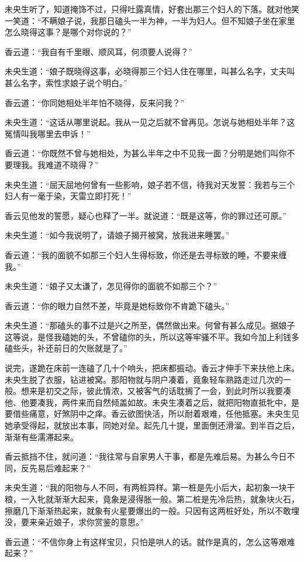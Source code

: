 \documentclass[a4paper,12pt,UTF8,twoside]{ctexbook}
\begin{document}
未央生听了，知道掩饰不过，只得吐露真情，好套出那三个妇人的下落。就对他笑一笑道：“不瞒娘子说，我那日磕头一半为神，一半为妇人。但不知娘子坐在家里怎么晓得这事？是哪个对你说的？”

香云道：“我自有千里眼、顺风耳，何须要人说得？”

未央生道：“娘子既晓得这事，必晓得那三个妇人住在哪里，叫甚么名字，丈夫叫甚么名字，索性求娘子说个明白。”

香云道：“你同她相处半年怕不晓得，反来问我？”

未央生道：“这话从哪里说起。我从一见之后就不曾再见。怎说与她相处半年？这冤情叫我哪里去申诉！”

香云道：“你既然不曾与她相处，为甚么半年之中不见我一面？分明是她们叫你不要理我。我难道不晓得？”

未央生道：“屈天屈地何曾有一些影响，娘子若不信，待我对天发誓：我若与三个妇人有一毫于染，天雷立即打死！”

香云见他发的誓愿，疑心也释了一半。就说道：“既是这等，你的罪过还可原。”

未央生道：“如今我说明了，请娘子揭开被窝，放我进来睡罢。”

香云道：“我的面貌不如那三个妇人生得标致，你还是去寻标致的睡，不要来缠我。”

未央生道：“娘子又太谦了，怎见得你的面貌不如那三个？”

香云道：“你的眼力自然不差，毕竟是她标致你不肯跪下磕头。”

未央生道：“那磕头的事不过是兴之所至，偶然做出来。何曾有甚么成见。据娘子这等说，是怪我磕她的头，不曾磕你的头，所以这等牢骚不平。我如今加上利钱多磕些头，补还前日的欠账就是了。”

说完，遂跪在床前一连磕了几十个响头，把床都振动。香云才伸手下来扶他上床。未央生脱了衣服，钻进被窝。那阳物就与阴户凑着，竟象轻车熟路走过几次的一般。想来是初交之际，彼此情浓，又被客气的话耽搁了一会，到此时所以我要凑他、他要凑我，两件来而自然倾盖如故。未央生凑着之后，就把阳物直抵牝中，是要借些痛意，好煞阴中之痒。香云欲图快活，所以耐着艰难，任他抵塞。未央生见她承受得起，就放出本事，同她对垒。起先几十提，里面倒还滑溜。到半百之后，渐渐有些濡滞起来。

香云抵挡不住，就问道：“我往常与自家男人干事，都是先难后易。为甚么今日不同，反先易后难起来？”

未央生道：“我的阳物与人不同，有两桩异样。第一桩是先小后大，起初象一块干粮，一入牝就渐渐大起来，竟象是浸得胀一般。第二桩是先冷后热，就象块火石，擦磨几下渐渐热起来，就象有火星要爆出的一般。只因有这两桩好处，所以不敢埋没，要来亲近娘子，求你赏鉴的意思。”

香云道：“不信你身上有这样宝贝，只怕是哄人的话。就作是真的，怎么这等艰难起来？”
\end{document}
